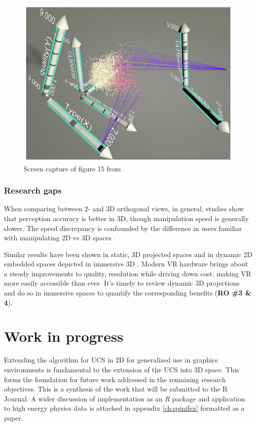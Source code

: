 \documentclass{monashthesis}
\begin{document}
\begin{figure}

{\centering \includegraphics[width=0.5\linewidth]{./figures/cordeil2017fig} 

}

\caption{Screen capture of figure 15 from
\textcite{cordeil_imaxes:_2017}.}\label{fig:cordeil2017fig}
\end{figure}

\subsection{Research gaps}\label{research-gaps-1}

When comparing between 2- and 3D orthogonal views, in general, studies
show that perception accuracy is better in 3D, though manipulation speed
is generally slower. The speed discrepancy is confounded by the
difference in users familiar with manipulating 2D vs 3D spaces
\autocites{lee_effects_1986}{wickens_implications_1994}{tory_visualization_2006}[counterexample][]{sedlmair_empirical_2013}.

Similar results have been shown in static, 3D projected spaces
\autocites{gracia_new_2016}{wagner_filho_immersive_2018} and in dynamic
2D embedded spaces depicted in immersive 3D
\autocite{nelson_xgobi_1998}. Modern VR hardware brings about a steady
improvements to quality, resolution while driving down cost, making VR
more easily accessible than ever. It's timely to review dynamic 3D
projections and do so in immersive spaces to quantify the corresponding
benefits (\textbf{RO \#3 \& 4}).

\chapter{Work in progress}\label{ch:workinprogress}

Extending the algorithm for UCS in 2D for generalized use in graphics
environments is fundamental to the extension of the UCS into 3D space.
This forms the foundation for future work addressed in the remaining
research objectives. This is a synthesis of the work that will be
submitted to the R Journal. A wider discussion of implementation as an
\emph{R} package and application to high energy physics data
\autocites{wang_visualizing_2018}{cook_dynamical_2018} is attached in
appendix \ref{ch:spinifex} formatted as a paper.
\end{document}
